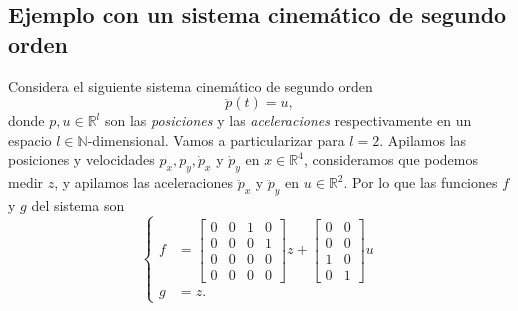 \subsection{Ejemplo con un sistema cinemático de segundo orden}
Considera el siguiente sistema cinemático de segundo orden
\begin{equation}
	\ddot p(t) = u,
	\label{eq: pdyn}
\end{equation}
donde $p,u\in\mathbb{R}^l$ son las \emph{posiciones} y las \emph{aceleraciones} respectivamente en un espacio $l\in\mathbb{N}$-dimensional. Vamos a particularizar para $l=2$. Apilamos las posiciones y velocidades $p_x,p_y,\dot p_x$ y $\dot p_y$ en $x\in\mathbb{R}^4$, consideramos que podemos medir $z$, y apilamos las aceleraciones $\ddot p_x$ y $\ddot p_y$ en $u\in\mathbb{R}^2$. Por lo que las funciones $f$ y $g$ del sistema son
\begin{equation}
	\begin{cases}
		f &= \begin{bmatrix}0 & 0 & 1 & 0 \\ 0 & 0 & 0 & 1 \\
		0 & 0 & 0 & 0 \\ 0 & 0 & 0 & 0 \end{bmatrix} z + \begin{bmatrix}0 & 0  \\ 0 & 0  \\ 1 & 0 \\ 0 & 1\end{bmatrix} u \\
			g &= z.
\end{cases}
\end{equation}

